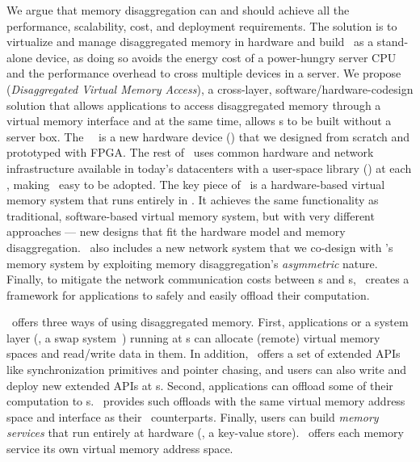 We argue that memory disaggregation can and should achieve all the performance, scalability, cost, and deployment requirements.
The solution is to virtualize and manage disaggregated memory in hardware and build \MN\ as a stand-alone device,
as doing so avoids the energy cost of a power-hungry server CPU and the performance overhead to cross multiple devices in a server.
We propose \textit{\sys} (\textit{Disaggregated Virtual Memory Access}), 
a cross-layer, software/hardware-codesign solution that %
allows applications to access disaggregated memory through a virtual memory interface
and at the same time, allows \MN{}s to be built without a server box.
The \sys\ \MN\ is a new hardware device (\textit{\sysboard}) that we designed from scratch and prototyped with FPGA. %
The rest of \sys\ uses common hardware and network infrastructure available in today's datacenters with a user-space library (\textit{\syslib}) at each \CN,
making \sys\ easy to be adopted.
The key piece of \sys\ is a hardware-based virtual memory system that runs entirely in \sysboard.
It achieves the same functionality as traditional, software-based virtual memory system,
but with very different approaches --- new designs that fit the hardware model and memory disaggregation.
\sys\ also includes a new network system that we co-design with \sys's memory system
by exploiting memory disaggregation's {\em asymmetric} nature.
Finally, to mitigate the network communication costs between \CN{}s and \MN{}s,
\sys\ creates a framework for applications to safely and easily offload their computation.

\sys\ offers three ways of using disaggregated memory.
First, applications or a system layer (\eg, a swap system~\cite{InfiniSwap,FastSwap}) running at \CN{}s can allocate (remote) virtual memory spaces and read/write data in them.
In addition, \sys\ offers a set of extended APIs like synchronization primitives and pointer chasing, %
and users can also write and deploy new extended APIs at \MN{}s.
Second, applications can offload some of their computation to \MN{}s.
\sys\ provides such offloads with the same virtual memory address space and interface as their \CN\ counterparts.
Finally, users can build \textit{memory services} that run entirely at \MN{} hardware (\eg, a key-value store).
\sys\ offers each memory service its own virtual memory address space.


